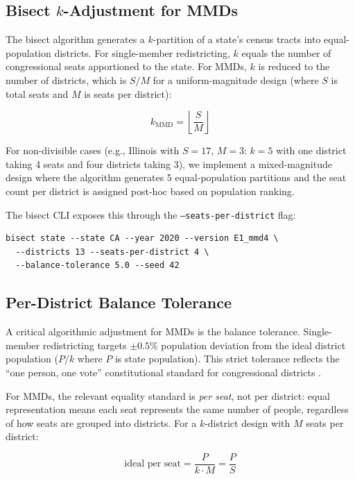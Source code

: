\subsection{Bisect $k$-Adjustment for MMDs}

The bisect algorithm generates a $k$-partition of a state's census tracts
into equal-population districts.  For single-member redistricting, $k$ equals
the number of congressional seats apportioned to the state.  For MMDs, $k$
is reduced to the number of districts, which is $S / M$ for a uniform-magnitude
design (where $S$ is total seats and $M$ is seats per district):

\begin{equation}
  k_{\text{MMD}} = \left\lfloor \frac{S}{M} \right\rfloor
\end{equation}

For non-divisible cases (e.g., Illinois with $S = 17$, $M = 3$: $k = 5$
with one district taking 4 seats and four districts taking 3), we implement
a mixed-magnitude design where the algorithm generates 5 equal-population
partitions and the seat count per district is assigned post-hoc based on
population ranking.

The bisect CLI exposes this through the \texttt{--seats-per-district} flag:

\begin{verbatim}
bisect state --state CA --year 2020 --version E1_mmd4 \
  --districts 13 --seats-per-district 4 \
  --balance-tolerance 5.0 --seed 42
\end{verbatim}

\subsection{Per-District Balance Tolerance}

A critical algorithmic adjustment for MMDs is the balance tolerance.
Single-member redistricting targets $\pm 0.5\%$ population deviation from
the ideal district population ($P / k$ where $P$ is state population).  This
strict tolerance reflects the ``one person, one vote'' constitutional
standard for congressional districts \citep{wesberry1964}.

For MMDs, the relevant equality standard is \emph{per seat}, not per
district: equal representation means each seat represents the same number of
people, regardless of how seats are grouped into districts.  For a $k$-district
design with $M$ seats per district:

\begin{equation}
  \text{ideal per seat} = \frac{P}{k \cdot M} = \frac{P}{S}
\end{equation}

